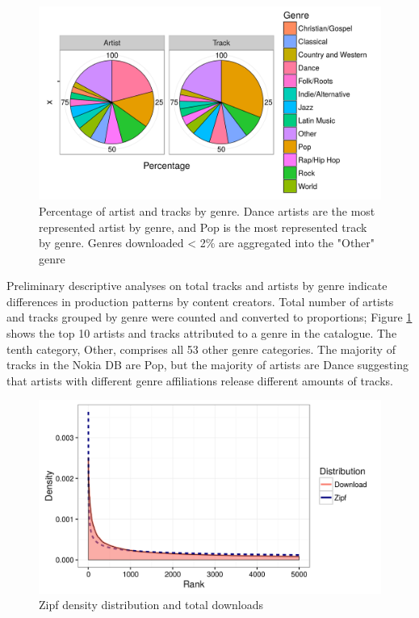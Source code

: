 \documentclass[a4paper]{article}
\begin{document}
\begin{figure}[h!]
\centering
\includegraphics[width=\linewidth]{cataloguePie}
\caption[Track and Artist Genre Distribution]{Percentage of artist and tracks by genre. Dance artists are the most represented artist by genre, and Pop is the most represented track by genre. Genres downloaded < 2\% are aggregated into the "Other" genre}
\label{fig:catpie}
\end{figure}

Preliminary descriptive analyses on total tracks and artists by genre indicate differences in production patterns by content creators.  Total number of artists and tracks grouped by genre were counted and converted to proportions; Figure \ref{fig:catpie} shows the top 10 artists and tracks attributed to a genre in the catalogue. The tenth category, Other, comprises all 53 other genre categories. The majority of tracks in the Nokia DB are Pop, but the majority of artists are Dance suggesting that artists with different genre affiliations release different amounts of tracks.

\begin{figure}[h!]
\centering
\includegraphics[width=\linewidth]{zipfTrack}
\caption[Zipf distribution and track downloads]{Zipf density distribution and total downloads}
\label{fig:zipf}
\end{figure}
\end{document}
